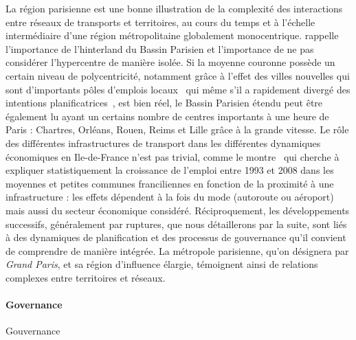 La région parisienne est une bonne illustration de la complexité des interactions entre réseaux de transports et territoires, au cours du temps et à l'échelle intermédiaire d'une région métropolitaine globalement monocentrique. \cite{gilli2005bassin} rappelle l'importance de l'hinterland du Bassin Parisien et l'importance de ne pas considérer l'hypercentre de manière isolée. Si la moyenne couronne possède un certain niveau de polycentricité, notamment grâce à l'effet des villes nouvelles qui sont d'importants pôles d'emplois locaux~\cite{berroir2005contribution} qui même s'il a rapidement divergé des intentions planificatrices~\cite{es119}, est bien réel, le Bassin Parisien étendu peut être également lu ayant un certains nombre de centres importants à une heure de Paris : Chartres, Orléans, Rouen, Reims et Lille grâce à la grande vitesse. Le rôle des différentes infrastructures de transport dans les différentes dynamiques économiques en Ile-de-France n'est pas trivial, comme le montre~\cite{PADEIRO201344} qui cherche à expliquer statistiquement la croissance de l'emploi entre 1993 et 2008 dans les moyennes et petites communes franciliennes en fonction de la proximité à une infrastructure : les effets dépendent à la fois du mode (autoroute ou aéroport) mais aussi du secteur économique considéré. Réciproquement, les développements successifs, généralement par ruptures, que nous détaillerons par la suite, sont liés à des dynamiques de planification et des processus de gouvernance qu'il convient de comprendre de manière intégrée. La métropole parisienne, qu'on désignera par \emph{Grand Paris}, et sa région d'influence élargie, témoignent ainsi de relations complexes entre territoires et réseaux.




\paragraph{Governance}{Gouvernance}

